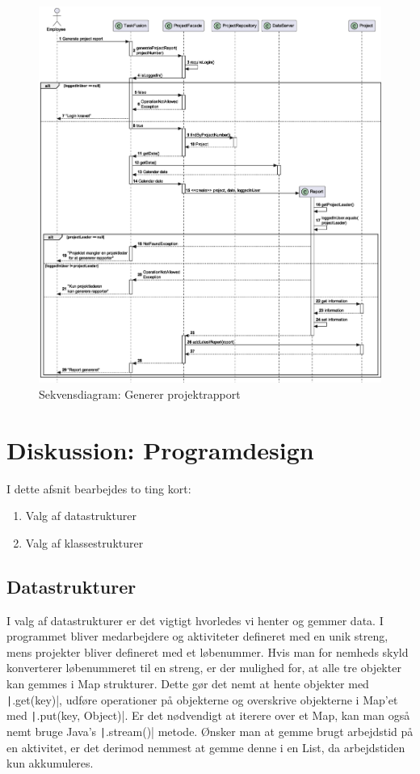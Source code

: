 \begin{figure}[H]
    \centering
    \caption{Sekvensdiagram: Generer projektrapport}\label{fig:sequenceGenerateProjectReport}
    \includegraphics[width=\textwidth]{RequirementsAndDesign/SequenceDiagrams/seqGenerateProjectReport.eps}
\end{figure}\newpage
\section{Diskussion: Programdesign}
I dette afsnit bearbejdes to ting kort:
\begin{enumerate}
    \item Valg af datastrukturer
    \item Valg af klassestrukturer
\end{enumerate}
\subsection{Datastrukturer} I valg af datastrukturer er det vigtigt hvorledes vi henter og gemmer data. I programmet bliver medarbejdere og aktiviteter defineret med en unik streng, mens projekter bliver defineret med et løbenummer. Hvis man for nemheds skyld konverterer løbenummeret til en streng, er der mulighed for, at alle tre objekter kan gemmes i Map strukturer. Dette gør det nemt at hente objekter med \texttt|.get(key)|, udføre operationer på objekterne og overskrive objekterne i Map'et med \texttt|.put(key, Object)|. Er det nødvendigt at iterere over et Map, kan man også nemt bruge Java's \texttt|.stream()| metode. Ønsker man at gemme brugt arbejdstid på en aktivitet, er det derimod nemmest at gemme denne i en List, da arbejdstiden kun akkumuleres.
